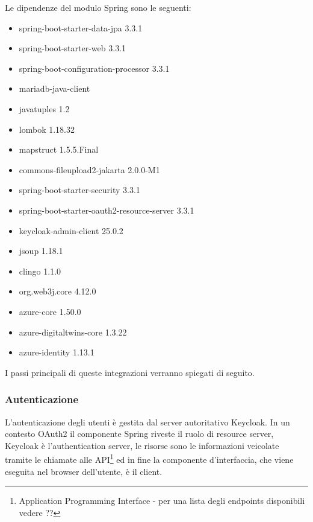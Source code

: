\documentclass[a4paper,11pt]{article}
\begin{document}
Le dipendenze del modulo Spring sono le seguenti:

\begin{itemize}
\item spring-boot-starter-data-jpa 3.3.1
\item spring-boot-starter-web 3.3.1
\item spring-boot-configuration-processor 3.3.1
\item mariadb-java-client
\item javatuples 1.2
\item lombok 1.18.32
\item mapstruct 1.5.5.Final
\item commons-fileupload2-jakarta 2.0.0-M1
\item spring-boot-starter-security 3.3.1
\item spring-boot-starter-oauth2-resource-server 3.3.1
\item keycloak-admin-client 25.0.2
\item jsoup 1.18.1
\item clingo 1.1.0
\item org.web3j.core 4.12.0
\item azure-core 1.50.0
\item azure-digitaltwins-core 1.3.22
\item azure-identity 1.13.1
\end{itemize}




I passi principali di queste integrazioni verranno spiegati di seguito.


\subsubsection{Autenticazione}
L'autenticazione degli utenti è gestita dal server autoritativo Keycloak. In un contesto OAuth2 il componente Spring riveste il ruolo di resource server, Keycloak è l'authentication server, le risorse sono le informazioni veicolate tramite le chiamate alle API\footnote{Application Programming Interface - per una lista degli endpoints disponibili vedere ?? } ed in fine la componente d'interfaccia, che viene eseguita nel browser dell'utente, è il client.
\end{document}
